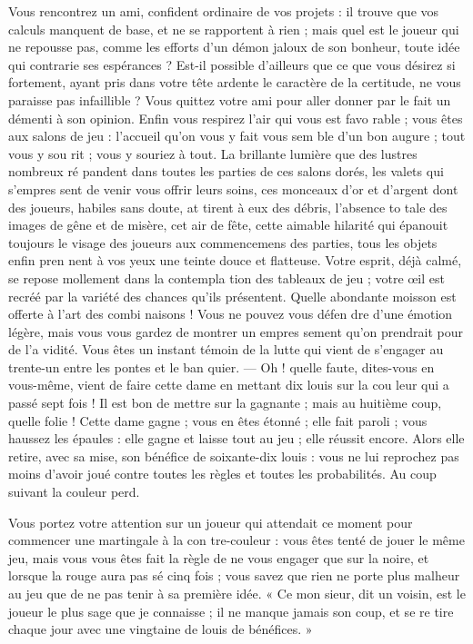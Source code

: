 Vous rencontrez un ami, confident
ordinaire de vos projets : il trouve que
vos calculs manquent de base, et ne
se rapportent à rien ; mais quel est le
joueur qui ne repousse pas, comme
les efforts d'un démon jaloux de son
bonheur, toute idée qui contrarie ses
espérances ? Est-il possible d'ailleurs
que ce que vous désirez si fortement,
ayant pris dans votre tête ardente le
caractère de la certitude, ne vous
paraisse pas infaillible ? Vous quittez
votre ami pour aller donner par le
fait un démenti à son opinion. Enfin
vous respirez l'air qui vous est favo%
rable ; vous êtes aux salons de jeu :
l'accueil qu'on vous y fait vous sem%
ble d'un bon augure ; tout vous y sou%
rit ; vous y souriez à tout. La brillante
lumière que des lustres nombreux ré%
pandent dans toutes les parties de ces
salons dorés, les valets qui s'empres%
sent de venir vous offrir leurs soins,
ces monceaux d'or et d'argent dont
des joueurs, habiles sans doute, at%
tirent à eux des débris, l'absence to%
tale des images de gêne et de misère,
cet air de fête, cette aimable hilarité
qui épanouit toujours le visage des
joueurs aux commencemens des
parties, tous les objets enfin pren%
nent à vos yeux une teinte douce et
flatteuse. Votre esprit, déjà calmé, se
repose mollement dans la contempla%
tion des tableaux de jeu ; votre œil
est recréé par la variété des chances
qu'ils présentent. Quelle abondante
moisson est offerte à l'art des combi%
naisons ! Vous ne pouvez vous défen%
dre d'une émotion légère, mais vous
vous gardez de montrer un empres%
sement qu'on prendrait pour de l'a%
vidité. Vous êtes un instant témoin
de la lutte qui vient de s'engager au
trente-un entre les pontes et le ban%
quier. --- Oh ! quelle faute, dites-vous
en vous-même, vient de faire cette
dame en mettant dix louis sur la cou%
leur qui a passé sept fois ! Il est bon
de mettre sur la gagnante ; mais au
huitième coup, quelle folie ! Cette
dame gagne ; vous en êtes étonné ; elle
fait paroli ; vous haussez les épaules :
elle gagne et laisse tout au jeu ; elle
réussit encore. Alors elle retire, avec
sa mise, son bénéfice de soixante-dix
louis : vous ne lui reprochez pas moins
d'avoir joué contre toutes les règles
et toutes les probabilités. Au coup
suivant la couleur perd. 

Vous portez votre attention sur un
joueur qui attendait ce moment pour
commencer une martingale à la con%
tre-couleur : vous êtes tenté de jouer
le même jeu, mais vous vous êtes fait
la règle de ne vous engager que sur
la noire, et lorsque la rouge aura pas%
sé cinq fois ; vous savez que rien ne
porte plus malheur au jeu que de ne
pas tenir à sa première idée. « Ce mon%
sieur, dit un voisin, est le joueur
le plus sage que je connaisse ; il ne
manque jamais son coup, et se re%
tire chaque jour avec une vingtaine
de louis de bénéfices. »

